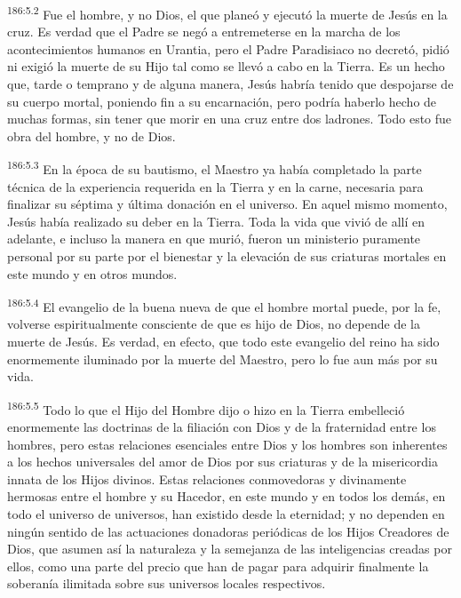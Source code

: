 \par 
\textsuperscript{186:5.2} Fue el hombre, y no Dios, el que planeó y ejecutó la muerte de Jesús en la cruz. Es verdad que el Padre se negó a entremeterse en la marcha de los acontecimientos humanos en Urantia, pero el Padre Paradisiaco no decretó, pidió ni exigió la muerte de su Hijo tal como se llevó a cabo en la Tierra. Es un hecho que, tarde o temprano y de alguna manera, Jesús habría tenido que despojarse de su cuerpo mortal, poniendo fin a su encarnación, pero podría haberlo hecho de muchas formas, sin tener que morir en una cruz entre dos ladrones. Todo esto fue obra del hombre, y no de Dios.

\par 
\textsuperscript{186:5.3} En la época de su bautismo, el Maestro ya había completado la parte técnica de la experiencia requerida en la Tierra y en la carne, necesaria para finalizar su séptima y última donación en el universo. En aquel mismo momento, Jesús había realizado su deber en la Tierra. Toda la vida que vivió de allí en adelante, e incluso la manera en que murió, fueron un ministerio puramente personal por su parte por el bienestar y la elevación de sus criaturas mortales en este mundo y en otros mundos.

\par 
\textsuperscript{186:5.4} El evangelio de la buena nueva de que el hombre mortal puede, por la fe, volverse espiritualmente consciente de que es hijo de Dios, no depende de la muerte de Jesús. Es verdad, en efecto, que todo este evangelio del reino ha sido enormemente iluminado por la muerte del Maestro, pero lo fue aun más por su vida.

\par 
\textsuperscript{186:5.5} Todo lo que el Hijo del Hombre dijo o hizo en la Tierra embelleció enormemente las doctrinas de la filiación con Dios y de la fraternidad entre los hombres, pero estas relaciones esenciales entre Dios y los hombres son inherentes a los hechos universales del amor de Dios por sus criaturas y de la misericordia innata de los Hijos divinos. Estas relaciones conmovedoras y divinamente hermosas entre el hombre y su Hacedor, en este mundo y en todos los demás, en todo el universo de universos, han existido desde la eternidad; y no dependen en ningún sentido de las actuaciones donadoras periódicas de los Hijos Creadores de Dios, que asumen así la naturaleza y la semejanza de las inteligencias creadas por ellos, como una parte del precio que han de pagar para adquirir finalmente la soberanía ilimitada sobre sus universos locales respectivos.

